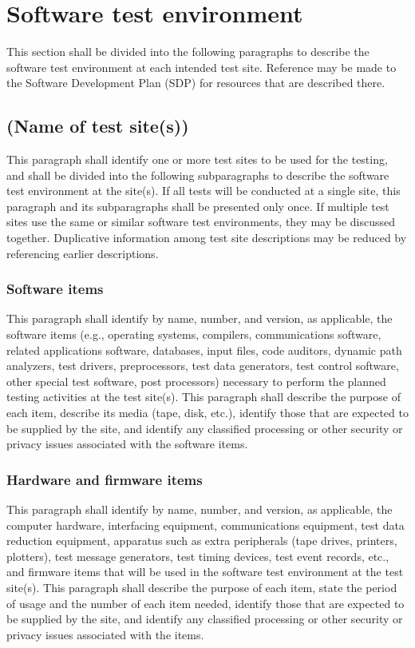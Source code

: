\documentclass{fidata-report-template}
\begin{document}
\section{Software test environment}

This section shall be divided into the following paragraphs to describe
the software test environment at each intended test site. Reference may
be made to the Software Development Plan (SDP) for resources that are
described there.

\subsection{(Name of test site(s))}

This paragraph shall identify one or more test sites to be used for the
testing, and shall be divided into the following subparagraphs to
describe the software test environment at the site(s). If all tests will
be conducted at a single site, this paragraph and its subparagraphs
shall be presented only once. If multiple test sites use the same or
similar software test environments, they may be discussed together.
Duplicative information among test site descriptions may be reduced by
referencing earlier descriptions.

\subsubsection{Software items}

This paragraph shall identify by name, number, and version, as
applicable, the software items (e.g., operating systems, compilers,
communications software, related applications software, databases, input
files, code auditors, dynamic path analyzers, test drivers,
preprocessors, test data generators, test control software, other
special test software, post processors) necessary to perform the planned
testing activities at the test site(s). This paragraph shall describe
the purpose of each item, describe its media (tape, disk, etc.),
identify those that are expected to be supplied by the site, and
identify any classified processing or other security or privacy issues
associated with the software items.

\subsubsection{Hardware and firmware items}

This paragraph shall identify by name, number, and version, as
applicable, the computer hardware, interfacing equipment, communications
equipment, test data reduction equipment, apparatus such as extra
peripherals (tape drives, printers, plotters), test message generators,
test timing devices, test event records, etc., and firmware items that
will be used in the software test environment at the test site(s). This
paragraph shall describe the purpose of each item, state the period of
usage and the number of each item needed, identify those that are
expected to be supplied by the site, and identify any classified
processing or other security or privacy issues associated with the
items.
\end{document}
